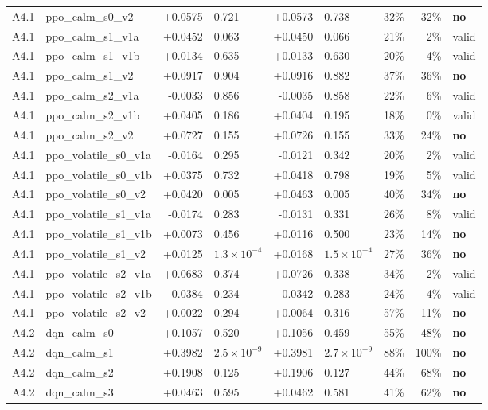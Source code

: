 \begin{table}[htbp]
\begin{tabular}{llrlrlrrl}
A4.1 & ppo\_calm\_s0\_v2 & +0.0575 & 0.721 & +0.0573 & 0.738 & 32\% & 32\% & \textbf{no} \\
A4.1 & ppo\_calm\_s1\_v1a & +0.0452 & 0.063 & +0.0450 & 0.066 & 21\% & 2\% & valid \\
A4.1 & ppo\_calm\_s1\_v1b & +0.0134 & 0.635 & +0.0133 & 0.630 & 20\% & 4\% & valid \\
A4.1 & ppo\_calm\_s1\_v2 & +0.0917 & 0.904 & +0.0916 & 0.882 & 37\% & 36\% & \textbf{no} \\
A4.1 & ppo\_calm\_s2\_v1a & -0.0033 & 0.856 & -0.0035 & 0.858 & 22\% & 6\% & valid \\
A4.1 & ppo\_calm\_s2\_v1b & +0.0405 & 0.186 & +0.0404 & 0.195 & 18\% & 0\% & valid \\
A4.1 & ppo\_calm\_s2\_v2 & +0.0727 & 0.155 & +0.0726 & 0.155 & 33\% & 24\% & \textbf{no} \\
A4.1 & ppo\_volatile\_s0\_v1a & -0.0164 & 0.295 & -0.0121 & 0.342 & 20\% & 2\% & valid \\
A4.1 & ppo\_volatile\_s0\_v1b & +0.0375 & 0.732 & +0.0418 & 0.798 & 19\% & 5\% & valid \\
A4.1 & ppo\_volatile\_s0\_v2 & +0.0420 & 0.005 & +0.0463 & 0.005 & 40\% & 34\% & \textbf{no} \\
A4.1 & ppo\_volatile\_s1\_v1a & -0.0174 & 0.283 & -0.0131 & 0.331 & 26\% & 8\% & valid \\
A4.1 & ppo\_volatile\_s1\_v1b & +0.0073 & 0.456 & +0.0116 & 0.500 & 23\% & 14\% & \textbf{no} \\
A4.1 & ppo\_volatile\_s1\_v2 & +0.0125 & $1.3\times 10^{-4}$ & +0.0168 & $1.5\times 10^{-4}$ & 27\% & 36\% & \textbf{no} \\
A4.1 & ppo\_volatile\_s2\_v1a & +0.0683 & 0.374 & +0.0726 & 0.338 & 34\% & 2\% & valid \\
A4.1 & ppo\_volatile\_s2\_v1b & -0.0384 & 0.234 & -0.0342 & 0.283 & 24\% & 4\% & valid \\
A4.1 & ppo\_volatile\_s2\_v2 & +0.0022 & 0.294 & +0.0064 & 0.316 & 57\% & 11\% & \textbf{no} \\
\midrule
A4.2 & dqn\_calm\_s0 & +0.1057 & 0.520 & +0.1056 & 0.459 & 55\% & 48\% & \textbf{no} \\
A4.2 & dqn\_calm\_s1 & +0.3982 & $2.5\times 10^{-9}$ & +0.3981 & $2.7\times 10^{-9}$ & 88\% & 100\% & \textbf{no} \\
A4.2 & dqn\_calm\_s2 & +0.1908 & 0.125 & +0.1906 & 0.127 & 44\% & 68\% & \textbf{no} \\
A4.2 & dqn\_calm\_s3 & +0.0463 & 0.595 & +0.0462 & 0.581 & 41\% & 62\% & \textbf{no} \\

\end{tabular}
\end{table}
